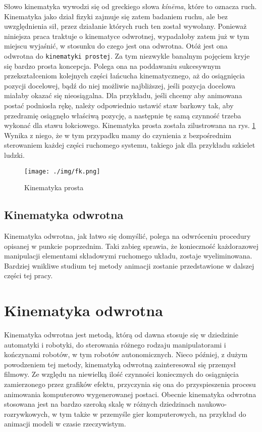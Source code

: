 \documentclass[11pt]{mwrep}
\begin{document}
  Słowo kinematyka wywodzi się od greckiego słowa \textit{kín\={e}ma}, które to oznacza ruch. Kinematyka jako dział fizyki zajmuje się zatem badaniem ruchu, ale bez uwzględnienia sił, przez działanie których ruch ten został wywołany. Ponieważ niniejsza praca traktuje o kinematyce odwrotnej, wypadałoby zatem już w tym miejscu wyjaśnić, w stosunku do czego jest ona odwrotna. Otóż jest ona odwrotna do \texttt{kinematyki prostej}. Za tym niezwykle banalnym pojęciem kryje się bardzo prosta koncepcja. Polega ona na poddawaniu sukcesywnym przekształceniom kolejnych części łańcucha kinematycznego, aż do osiągnięcia pozycji docelowej, bądź do niej możliwie najbliższej, jeśli pozycja docelowa miałaby okazać się nieosiągalna. Dla przykładu, jeśli chcemy aby animowana postać podniosła rękę, należy odpowiednio ustawić staw barkowy tak, aby przedramię osiągnęło właściwą pozycję, a następnie tę samą czynność trzeba wykonać dla stawu łokciowego. Kinematyka prosta została zilustrowana na rys. \ref{img:fk} Wynika z niego, że w tym przypadku mamy do czynienia z bezpośrednim sterowaniem każdej części ruchomego systemu, takiego jak dla przykładu szkielet ludzki.

  \begin{figure}
  \centering
    \texttt{[image: ./img/fk.png]}
  \caption{Kinematyka prosta}
  \label{img:fk}
  \end{figure}

  \section{Kinematyka odwrotna}

  Kinematyka odwrotna, jak łatwo się domyślić, polega na odwróceniu procedury opisanej w punkcie poprzednim. Taki zabieg sprawia, że konieczność każdorazowej manipulacji elementami składowymi ruchomego układu, zostaje wyeliminowana. Bardziej wnikliwe studium tej metody animacji zostanie przedstawione w dalszej części tej pracy.


  
\chapter{Kinematyka odwrotna}

Kinematyka odwrotna jest metodą, którą od dawna stosuje się w dziedzinie automatyki i robotyki, do sterowania różnego rodzaju manipulatorami i kończynami robotów, w tym robotów autonomicznych. Nieco później, z dużym powodzeniem tej metody, kinematyką odwrotną zainteresował się przemysł filmowy. Ze względu na niewielką ilość czynności koniecznych do osiągnięcia zamierzonego przez grafików efektu, przyczynia się ona do przyspieszenia procesu animowania komputerowo wygenerowanej postaci. Obecnie kinematyka odwrotna stosowana jest na bardzo szeroką skalę w różnych dziedzinach naukowo-rozrywkowych, w tym także w przemyśle gier komputerowych, na przykład do animacji modeli w czasie rzeczywistym.
\end{document}
